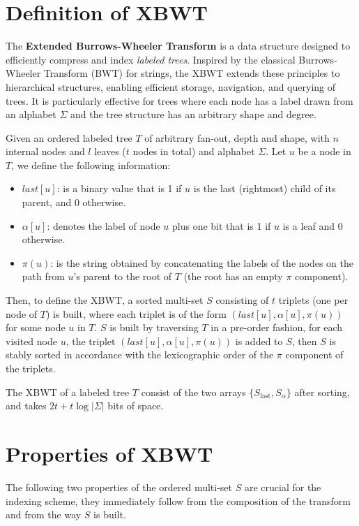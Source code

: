\section{Definition of XBWT}
The \textbf{Extended Burrows-Wheeler Transform} is a data structure designed to efficiently compress and index \emph{labeled trees}. Inspired by the classical Burrows-Wheeler Transform (BWT) \cite{burrows1994block} for strings, the XBWT extends these principles to hierarchical structures, enabling efficient storage, navigation, and querying of trees. It is particularly effective for trees where each node has a label drawn from an alphabet $\Sigma$ and the tree structure has an arbitrary shape and degree.

Given an ordered labeled tree $T$ of arbitrary fan-out, depth and shape, with $n$ internal nodes and $l$ leaves ($t$ nodes in total) and alphabet $\Sigma$. Let $u$ be a node in $T$, we define the following information:
\begin{itemize}
    \item $last[u]$: is a binary value that is 1 if $u$ is the last (rightmost) child of its parent, and 0 otherwise.
    \item $\alpha[u]$: denotes the label of node $u$ plus one bit that is 1 if $u$ is a leaf and 0 otherwise.
    \item $\pi(u)$: is the string obtained by concatenating the labels of the nodes on the path from $u$'s parent to the root of $T$ (the root has an empty $\pi$ component).
\end{itemize}

Then, to define the XBWT, a sorted multi-set $S$ consisting of $t$ triplets (one per node of $T$) is built, where each triplet is of the form $(last[u], \alpha[u], \pi(u))$ for some node $u$ in $T$. $S$ is built by traversing $T$ in a pre-order fashion, for each visited node $u$, the triplet $(last[u], \alpha[u], \pi(u))$ is added to $S$, then $S$ is stably sorted in accordance with the lexicographic order of the $\pi$ component of the triplets.

\begin{theorem}
    The XBWT of a labeled tree $T$ consist of the two arrays $\{S_{\text{last}}, S_{\alpha}\}$ after sorting, and takes $2t + t \log |\Sigma|$ bits of space. 
\end{theorem}

\section{Properties of XBWT}
The following two properties of the ordered multi-set $S$ are crucial for the indexing scheme, they immediately follow from the composition of the transform and from the way $S$ is built.

